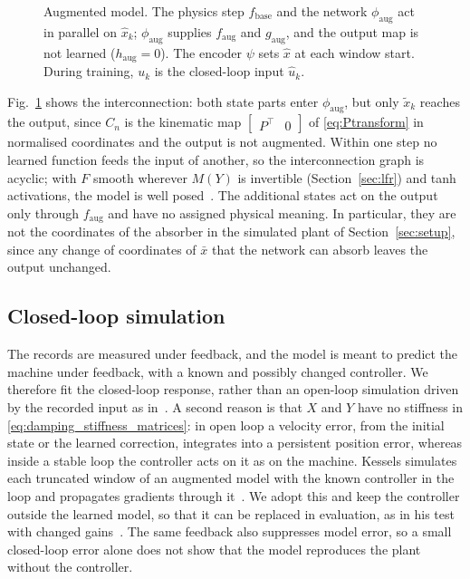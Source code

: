 \begin{figure}[t]
 \centering
 \resizebox{\columnwidth}{!}{}
 \caption{Augmented model. The physics step $f_{\mathrm{base}}$ and the
 network $\phi_{\mathrm{aug}}$ act in parallel on $\hat x_k$;
 $\phi_{\mathrm{aug}}$ supplies $f_{\mathrm{aug}}$ and $g_{\mathrm{aug}}$,
 and the output map is not learned ($h_{\mathrm{aug}}=0$). The encoder
 $\psi$ sets $\hat x$ at each window start. During training, $u_k$ is the
 closed-loop input $\hat u_k$.}
 \label{fig:aug_structure}
\end{figure}

Fig.~\ref{fig:aug_structure} shows the interconnection: both state parts
enter $\phi_{\mathrm{aug}}$, but only $\tilde x_k$ reaches the output, since
$C_n$ is the kinematic map $\begin{bmatrix}P^\top & 0\end{bmatrix}$ of
\eqref{eq:Ptransform} in normalised coordinates and the output is not
augmented.
Within one step no learned function feeds the input of another, so the
interconnection graph is acyclic; with $F$ smooth wherever $M(Y)$ is
invertible (Section~\ref{sec:lfr}) and tanh activations, the model is well
posed~\cite[Thm.~9]{hoekstra2026lfr}.
The additional states act on the output only through $f_{\mathrm{aug}}$ and
have no assigned physical meaning.
In particular, they are not the coordinates of the absorber in the simulated
plant of Section~\ref{sec:setup}, since any change of coordinates of
$\bar x$ that the network can absorb leaves the output unchanged.

\subsection{Closed-loop simulation}\label{sec:aug_closed_loop}
The records are measured under feedback, and the model is meant to predict
the machine under feedback, with a known and possibly changed controller.
We therefore fit the closed-loop response, rather than an open-loop
simulation driven by the recorded input as
in~\cite[Eq.~(22)]{hoekstra2026lfr}.
A second reason is that $X$ and $Y$ have no stiffness in
\eqref{eq:damping_stiffness_matrices}: in open loop a velocity error, from
the initial state or the learned correction, integrates into a persistent
position error, whereas inside a stable loop the controller acts on it as on
the machine.
Kessels simulates each truncated window of an augmented model with the known
controller in the loop and propagates gradients through
it~\cite[Eqs.~(5.12), (5.13c), (5.13d)]{kessels2025ai}.
We adopt this and keep the controller outside the learned model, so that it
can be replaced in evaluation, as in his test with changed
gains~\cite[Sec.~5.3.2.3]{kessels2025ai}.
The same feedback also suppresses model error, so a small closed-loop error
alone does not show that the model reproduces the plant without the
controller.

